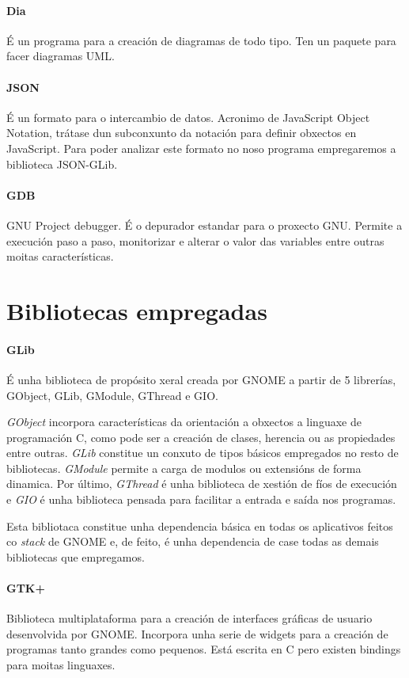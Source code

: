 \paragraph{Dia} É un programa para a creación de diagramas de todo tipo. Ten un paquete para facer diagramas UML.

\paragraph{JSON} É un formato para o intercambio de datos. Acronimo de JavaScript Object Notation, trátase dun subconxunto da notación para definir obxectos en JavaScript. Para poder analizar este formato no noso programa empregaremos a biblioteca JSON-GLib.

\paragraph{GDB} GNU Project debugger. É o depurador estandar para o proxecto GNU. Permite a execución paso a paso, monitorizar e alterar o valor das variables entre outras moitas características.

\section{Bibliotecas empregadas}

\paragraph{GLib} É unha biblioteca de propósito xeral creada por GNOME a partir de 5 librerías, GObject, GLib, GModule, GThread e GIO.

\emph{GObject} incorpora características da orientación a obxectos a linguaxe de programación C, como pode ser a creación de clases, herencia ou as propiedades entre outras. \emph{GLib} constitue un conxuto de tipos básicos empregados no resto de bibliotecas. \emph{GModule} permite a carga de modulos ou extensións de forma dinamica. Por último, \emph{GThread} é unha biblioteca de xestión de fíos de execución e \emph{GIO} é unha biblioteca pensada para facilitar a entrada e saída nos programas.

Esta bibliotaca constitue unha dependencia básica en todas os aplicativos feitos co \emph{stack} de GNOME e, de feito, é unha dependencia de case todas as demais bibliotecas que empregamos.

\paragraph{GTK+} Biblioteca multiplataforma para a creación de interfaces gráficas de usuario desenvolvida por GNOME. Incorpora unha serie de widgets para a creación de programas tanto grandes como pequenos. Está escrita en C pero existen bindings para moitas linguaxes.


